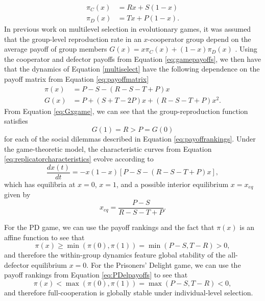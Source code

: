 \documentclass[11pt]{article}
\numberwithin{equation}{section}
\newcommand{\dsddt}[1]{\displaystyle\frac{d #1}{dt}}
\begin{document}
{\begin{subequations}
\begin{align}
    \pi_C(x) &= R x + S (1-x) \\
    \pi_D(x) &= T x + P (1-x).
\end{align}
\end{subequations}
%
 In previous work on multilevel selection in evolutionary games, it was assumed that the group-level reproduction rate in an $x$-cooperator group depend on the average payoff of group members $G(x) = x \pi_C(x) + (1-x) \pi_D(x)$ \cite{cooney2019replicator,cooney2020analysis}. Using the cooperator and defector payoffs from Equation \eqref{eq:gamepayoffs}, we then have that the dynamics of Equation \eqref{multiselect} have the following dependence on the payoff matrix from Equation \eqref{eq:payoffmatrix}
\begin{subequations} \label{eq:gamepiG}
\begin{align} \label{eq:pixgame}
    \pi(x) &= P - S - \left(R - S - T + P \right) x \\
    G(x) &= P + \left( S + T - 2P \right)x + \left( R - S - T + P \right) x^2 \label{eq:Gxgame}.
\end{align}
\end{subequations}
From Equation \ref{eq:Gxgame}, we can see that the group-reproduction function satisfies 
\begin{equation} \label{eq:G01ranking}
G(1) = R > P = G(0)
\end{equation}
for each of the social dilemmas described in Equation \eqref{eq:payoffrankings}. Under the game-theoretic model, the characteristic curves from Equation \eqref{eq:replicatorcharacteristics} evolve according to
\begin{equation} \label{eq:characteristicsreplicatorgame}
   \dsddt{x(t)} = - x (1-x) \left[P - S - \left( R - S - T + P \right) x \right], 
\end{equation}
which has equilibria at $x = 0$, $x = 1$, and a possible interior equilibrium $x = x_{eq}$ given by
\begin{equation} \label{eq:interiorequilibrium}
    x_{eq} = \frac{P - S}{R - S - T + P}.
\end{equation}

For the PD game, we can use the payoff rankings and the fact that $\pi(x)$ is an affine function to see that
\[ \pi(x) \geq \min\left(\pi(0),\pi(1) \right) = \min\left(P - S,T - R \right) > 0, \]
and therefore the within-group dynamics feature global stability of the all-defector equilibrium $x = 0$. 
For the Prisoners' Delight game, we can use the payoff rankings from Equation \eqref{eq:PDelpayoffs} to see that 
\begin{equation} \label{eq:PDelpix}
    \pi(x) < \max(\pi(0),\pi(1)) = \max(P-S,T-R) < 0,
\end{equation}
and therefore full-cooperation is globally stable under individual-level selection.

}
\end{document}
